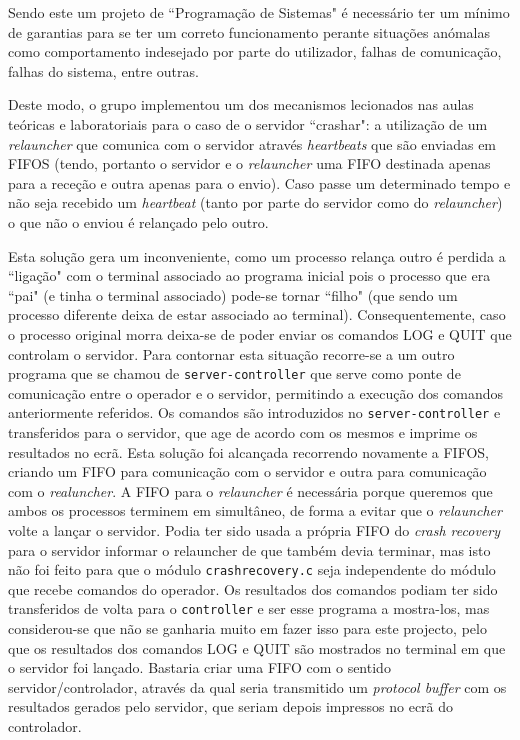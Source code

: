 \documentclass[a4paper]{article}
\begin{document}
	Sendo este um projeto de ``Programação de Sistemas" é necessário ter um mínimo de garantias para se ter um correto funcionamento perante situações anómalas como comportamento indesejado por parte do utilizador, falhas de comunicação, falhas do sistema, entre outras.  

	Deste modo, o grupo implementou um dos mecanismos lecionados nas aulas teóricas e laboratoriais para o caso de o servidor ``crashar": a utilização de um \textit{relauncher} que comunica com o servidor através \textit{heartbeats} que são enviadas em FIFOS (tendo, portanto o servidor e o \textit{relauncher} uma FIFO destinada apenas para a receção e outra apenas para o envio). Caso passe um determinado tempo e não seja recebido um \textit{heartbeat} (tanto por parte do servidor como do \textit{relauncher}) o que não o enviou é relançado pelo outro. 

	Esta solução gera um inconveniente, como um processo relança outro é perdida a ``ligação" com o terminal associado ao programa inicial pois o processo que era ``pai" (e tinha o terminal associado) pode-se tornar ``filho" (que sendo um processo diferente deixa de estar associado ao terminal). Consequentemente, caso o processo original morra deixa-se de poder enviar os comandos LOG e QUIT que controlam o servidor. Para contornar esta situação recorre-se a um outro programa que se chamou de \texttt{server-controller} que serve como ponte de comunicação entre o operador e o servidor, permitindo a execução dos comandos anteriormente referidos. Os comandos são introduzidos no \texttt{server-controller} e transferidos para o servidor, que age de acordo com os mesmos e imprime os resultados no ecrã. Esta solução foi alcançada recorrendo novamente a FIFOS, criando um FIFO para comunicação com o servidor e outra para comunicação com o \textit{realuncher}. A FIFO para o \textit{relauncher} é necessária porque queremos que ambos os processos terminem em simultâneo, de forma a evitar que o \textit{relauncher} volte a lançar o servidor. Podia ter sido usada a própria FIFO do \textit{crash recovery} para o servidor informar o relauncher de que também devia terminar, mas isto não foi feito para que o módulo \texttt{crashrecovery.c} seja independente do módulo que recebe comandos do operador. Os resultados dos comandos podiam ter sido transferidos de volta para o \texttt{controller} e ser esse programa a mostra-los, mas considerou-se que não se ganharia muito em fazer isso para este projecto, pelo que os resultados dos comandos LOG e QUIT são mostrados no terminal em que o servidor foi lançado. Bastaria criar uma FIFO com o sentido servidor/controlador, através da qual seria transmitido um \textit{protocol buffer} com os resultados gerados pelo servidor, que seriam depois impressos no ecrã do controlador.
\end{document}
